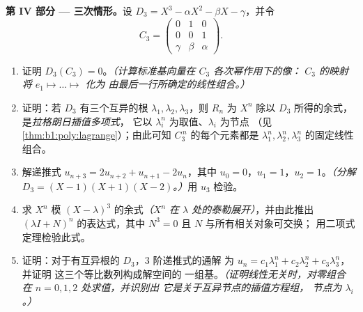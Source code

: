 \begin{problem}
\medskip
\noindent\textbf{第 IV 部分 --- 三次情形。}设 $D_3 = X^3 -
\alpha X^2 - \beta X - \gamma$，并令
\[
C_3 = \begin{pmatrix} 0 & 1 & 0\\ 0 & 0 & 1\\ \gamma & \beta &
\alpha \end{pmatrix}.
\]
\begin{enumerate}[resume]
  \item 证明 $D_3(C_3) = 0$。\emph{（计算标准基向量在
        $C_3$ 各次幂作用下的像：
        $C_3$ 的映射将 $e_1 \mapsto \dots \mapsto$ 化为
        由最后一行所确定的线性组合。）}
  \item 证明：若 $D_3$ 有三个互异的根 $\lambda_1,
        \lambda_2, \lambda_3$，则 $R_n$ 为 $X^n$
        除以 $D_3$ 所得的余式，是\emph{拉格朗日插值多项式}，
        它以 $\lambda_i^n$ 为取值、$\lambda_i$ 为节点
        （见\cref{thm:b1:poly:lagrange}）；由此可知
        $C_3^{\,n}$ 的每个元素都是
        $\lambda_1^n, \lambda_2^n, \lambda_3^n$ 的固定线性组合。
  \item 解递推式 $u_{n+3} = 2u_{n+2} + u_{n+1} - 2u_n$，其中 $u_0 =
        0$，$u_1 = 1$，$u_2 = 1$。\emph{（分解 $D_3 = (X - 1)(X
        + 1)(X - 2)$。）}用 $u_3$ 检验。
  \item 求 $X^n$ 模 $(X -
        \lambda)^3$ 的余式\emph{（$X^n$ 在
        $\lambda$ 处的泰勒展开）}，并由此推出 $(\lambda I +
        N)^n$ 的表达式，其中 $N^3 = 0$ 且 $N$ 与所有相关对象可交换；
        用二项式定理检验此式。
  \item 证明：对于有互异根的 $D_3$，$3$ 阶递推式的通解
        为 $u_n = c_1
        \lambda_1^n + c_2\lambda_2^n + c_3\lambda_3^n$，并证明
        这三个等比数列构成解空间的
        一组基。\emph{（证明线性无关时，对零组合
        在 $n = 0, 1, 2$ 处求值，并识别出
        它是关于互异节点的插值方程组，
        节点为 $\lambda_i$。）}
\end{enumerate}


\end{problem}

